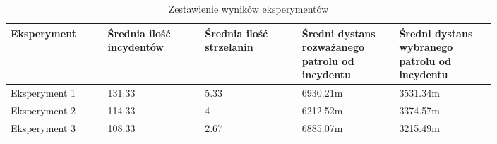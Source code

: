 \begin{table}[H]
    \centering
    \begin{tabular}{|p{0.16\linewidth}|p{0.16\linewidth}|p{0.16\linewidth}|p{0.16\linewidth}|p{0.16\linewidth}|}
        \hline
        Eksperyment & Średnia ilość incydentów & Średnia ilość strzelanin & Średni dystans rozważanego patrolu od incydentu & Średni dystans wybranego patrolu od incydentu \\
        \hline
        \hline
        Eksperyment 1 & 131.33 & 5.33 & 6930.21m & 3531.34m \\
        \hline
        Eksperyment 2 & 114.33 & 4 & 6212.52m & 3374.57m \\
        \hline
        Eksperyment 3 & 108.33 & 2.67 & 6885.07m & 3215.49m \\
        \hline
    \end{tabular}
    \caption{Zestawienie wyników eksperymentów}
    \label{tab:zestawienieWynikowEksperymentow}
\end{table}